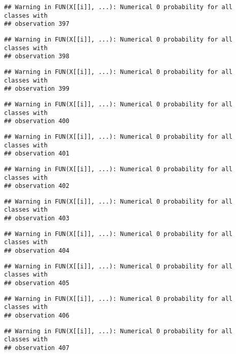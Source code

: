 \documentclass[
]{article}
\begin{document}
\begin{verbatim}
## Warning in FUN(X[[i]], ...): Numerical 0 probability for all classes with
## observation 397
\end{verbatim}

\begin{verbatim}
## Warning in FUN(X[[i]], ...): Numerical 0 probability for all classes with
## observation 398
\end{verbatim}

\begin{verbatim}
## Warning in FUN(X[[i]], ...): Numerical 0 probability for all classes with
## observation 399
\end{verbatim}

\begin{verbatim}
## Warning in FUN(X[[i]], ...): Numerical 0 probability for all classes with
## observation 400
\end{verbatim}

\begin{verbatim}
## Warning in FUN(X[[i]], ...): Numerical 0 probability for all classes with
## observation 401
\end{verbatim}

\begin{verbatim}
## Warning in FUN(X[[i]], ...): Numerical 0 probability for all classes with
## observation 402
\end{verbatim}

\begin{verbatim}
## Warning in FUN(X[[i]], ...): Numerical 0 probability for all classes with
## observation 403
\end{verbatim}

\begin{verbatim}
## Warning in FUN(X[[i]], ...): Numerical 0 probability for all classes with
## observation 404
\end{verbatim}

\begin{verbatim}
## Warning in FUN(X[[i]], ...): Numerical 0 probability for all classes with
## observation 405
\end{verbatim}

\begin{verbatim}
## Warning in FUN(X[[i]], ...): Numerical 0 probability for all classes with
## observation 406
\end{verbatim}

\begin{verbatim}
## Warning in FUN(X[[i]], ...): Numerical 0 probability for all classes with
## observation 407
\end{verbatim}
\end{document}
